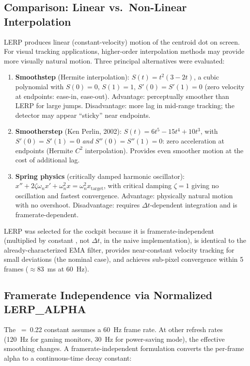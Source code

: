 \subsection{Comparison: Linear vs.\ Non-Linear Interpolation}

LERP produces linear (constant-velocity) motion of the centroid dot on screen. For visual tracking applications, higher-order interpolation methods may provide more visually natural motion. Three principal alternatives were evaluated:

\begin{enumerate}[leftmargin=1.6em]
  \item \textbf{Smoothstep} (Hermite interpolation): $S(t) = t^2(3-2t)$, a cubic polynomial with $S(0)=0$, $S(1)=1$, $S'(0)=S'(1)=0$ (zero velocity at endpoints: ease-in, ease-out). Advantage: perceptually smoother than LERP for large jumps. Disadvantage: more lag in mid-range tracking; the detector may appear ``sticky'' near endpoints.
  \item \textbf{Smootherstep} (Ken Perlin, 2002): $S(t) = 6t^5-15t^4+10t^3$, with $S'(0)=S'(1)=0$ \emph{and} $S''(0)=S''(1)=0$: zero acceleration at endpoints (Hermite $C^2$ interpolation). Provides even smoother motion at the cost of additional lag.
  \item \textbf{Spring physics} (critically damped harmonic oscillator): $x'' + 2\zeta\omega_n x' + \omega_n^2 x = \omega_n^2 x_{\text{target}}$, with critical damping $\zeta=1$ giving no oscillation and fastest convergence. Advantage: physically natural motion with no overshoot. Disadvantage: requires $\Delta t$-dependent integration and is framerate-dependent.
\end{enumerate}

LERP was selected for the cockpit because it is framerate-independent (multiplied by constant , not $\Delta t$, in the naive implementation), is identical to the already-characterized EMA filter, provides near-constant velocity tracking for small deviations (the nominal case), and achieves sub-pixel convergence within 5 frames ($\approx$83~ms at 60~Hz).

\subsection{Framerate Independence via Normalized LERP\_ALPHA}

The ~=~0.22 constant assumes a 60~Hz frame rate. At other refresh rates (120~Hz for gaming monitors, 30~Hz for power-saving mode), the effective smoothing changes. A framerate-independent formulation converts the per-frame alpha to a continuous-time decay constant:

